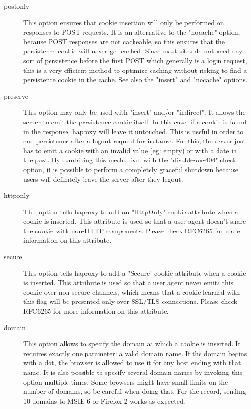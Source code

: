 \begin{description}
  \item[postonly]  This option ensures that cookie insertion will only be performed
              on responses to POST requests. It is an alternative to the
              "nocache" option, because POST responses are not cacheable, so
              this ensures that the persistence cookie will never get cached.
              Since most sites do not need any sort of persistence before the
              first POST which generally is a login request, this is a very
              efficient method to optimize caching without risking to find a
              persistence cookie in the cache.
              See also the "insert" and "nocache" options.

  \item[preserve]  This option may only be used with "insert" and/or "indirect". It
              allows the server to emit the persistence cookie itself. In this
              case, if a cookie is found in the response, haproxy will leave it
              untouched. This is useful in order to end persistence after a
              logout request for instance. For this, the server just has to
              emit a cookie with an invalid value (eg: empty) or with a date in
              the past. By combining this mechanism with the "disable-on-404"
              check option, it is possible to perform a completely graceful
              shutdown because users will definitely leave the server after
              they logout.

  \item[httponly]  This option tells haproxy to add an "HttpOnly" cookie attribute
              when a cookie is inserted. This attribute is used so that a
              user agent doesn't share the cookie with non-HTTP components.
              Please check RFC6265 for more information on this attribute.

  \item[secure]    This option tells haproxy to add a "Secure" cookie attribute when
              a cookie is inserted. This attribute is used so that a user agent
              never emits this cookie over non-secure channels, which means
              that a cookie learned with this flag will be presented only over
              SSL/TLS connections. Please check RFC6265 for more information on
              this attribute.

  \item[domain]    This option allows to specify the domain at which a cookie is
              inserted. It requires exactly one parameter: a valid domain
              name. If the domain begins with a dot, the browser is allowed to
              use it for any host ending with that name. It is also possible to
              specify several domain names by invoking this option multiple
              times. Some browsers might have small limits on the number of
              domains, so be careful when doing that. For the record, sending
              10 domains to MSIE 6 or Firefox 2 works as expected.


\end{description}
